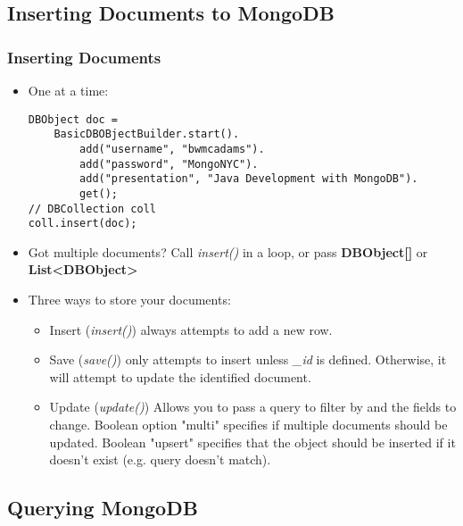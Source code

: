 \documentclass{beamer}
\begin{document}
\subsection[Inserting Documents to MongoDB]{Inserting Documents to MongoDB}

\begin{frame}[fragile]
\frametitle{Inserting Documents}
    \begin{itemize}
        \item<2-> One at a time:\\
\begin{lstlisting}
DBObject doc = 
    BasicDBOBjectBuilder.start().
        add("username", "bwmcadams").
        add("password", "MongoNYC").
        add("presentation", "Java Development with MongoDB").
        get();
// DBCollection coll
coll.insert(doc);
\end{lstlisting}
        \item<3-> Got multiple documents? Call {\em insert()} in a loop, or pass {\bf DBObject[]} or {\bf List<DBObject>}
        \item<4-> Three ways to store your documents:
        \begin{itemize}
            \item {\sc Insert} ({\em insert()}) always attempts to add a new row.
            \item {\sc Save} ({\em save()}) only attempts to insert unless {\em \_id} is defined.  Otherwise, it will attempt to update the identified document.
            \item {\sc Update} ({\em update()}) Allows you to pass a query to filter by and the fields to change.  Boolean option "multi" specifies if multiple documents should be updated.  Boolean "upsert" specifies that the object should be inserted if it doesn't exist (e.g. query doesn't match).
        \end{itemize}
    \end{itemize}
\end{frame}

\subsection[Querying MongoDB]{Querying MongoDB}
\end{document}
